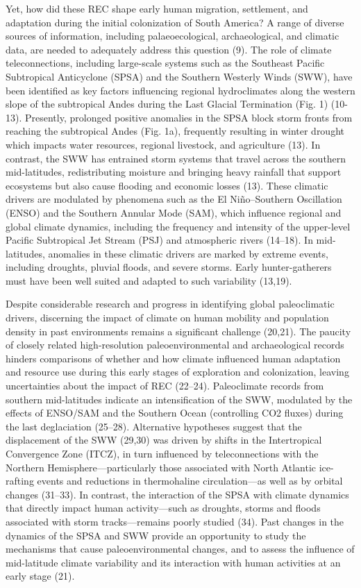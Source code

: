 \documentclass[
]{article}
\begin{document}
Yet, how did these REC shape early human migration, settlement, and
adaptation during the initial colonization of South America? A range of
diverse sources of information, including palaeoecological,
archaeological, and climatic data, are needed to adequately address this
question (9). The role of climate teleconnections, including large-scale
systems such as the Southeast Pacific Subtropical Anticyclone (SPSA) and
the Southern Westerly Winds (SWW), have been identified as key factors
influencing regional hydroclimates along the western slope of the
subtropical Andes during the Last Glacial Termination (Fig. 1) (10-13).
Presently, prolonged positive anomalies in the SPSA block storm fronts
from reaching the subtropical Andes (Fig. 1a), frequently resulting in
winter drought which impacts water resources, regional livestock, and
agriculture (13). In contrast, the SWW has entrained storm systems that
travel across the southern mid-latitudes, redistributing moisture and
bringing heavy rainfall that support ecosystems but also cause flooding
and economic losses (13). These climatic drivers are modulated by
phenomena such as the El Niño--Southern Oscillation (ENSO) and the
Southern Annular Mode (SAM), which influence regional and global climate
dynamics, including the frequency and intensity of the upper-level
Pacific Subtropical Jet Stream (PSJ) and atmospheric rivers (14--18). In
mid-latitudes, anomalies in these climatic drivers are marked by extreme
events, including droughts, pluvial floods, and severe storms. Early
hunter-gatherers must have been well suited and adapted to such
variability (13,19).

Despite considerable research and progress in identifying global
paleoclimatic drivers, discerning the impact of climate on human
mobility and population density in past environments remains a
significant challenge (20,21). The paucity of closely related
high-resolution paleoenvironmental and archaeological records hinders
comparisons of whether and how climate influenced human adaptation and
resource use during this early stages of exploration and colonization,
leaving uncertainties about the impact of REC (22--24). Paleoclimate
records from southern mid-latitudes indicate an intensification of the
SWW, modulated by the effects of ENSO/SAM and the Southern Ocean
(controlling CO2 fluxes) during the last deglaciation (25--28).
Alternative hypotheses suggest that the displacement of the SWW (29,30)
was driven by shifts in the Intertropical Convergence Zone (ITCZ), in
turn influenced by teleconnections with the Northern
Hemisphere---particularly those associated with North Atlantic
ice-rafting events and reductions in thermohaline circulation---as well
as by orbital changes (31--33). In contrast, the interaction of the SPSA
with climate dynamics that directly impact human activity---such as
droughts, storms and floods associated with storm tracks---remains
poorly studied (34). Past changes in the dynamics of the SPSA and SWW
provide an opportunity to study the mechanisms that cause
paleoenvironmental changes, and to assess the influence of mid-latitude
climate variability and its interaction with human activities at an
early stage (21).
\end{document}
